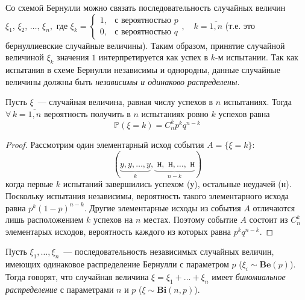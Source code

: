 Со схемой Бернулли можно связать последовательность случайных величин 
$\xi_1,\, \xi_2,\, \ldots,\, \xi_n,$ где $\xi_k = \begin{cases} 1, &\text{с вероятностью } p \\ 0, &\text{с вероятностью } q\end{cases}, \quad k = \overline{1, n}$ (т.е. это бернуллиевские случайные величины).
Таким образом, принятие случайной величиной $\xi_k$ значения $1$ интерпретируется как успех в $k$-м испытании.
Так как испытания в схеме Бернулли независимы и однородны, данные случайные величины должны быть \textit{независимы и одинаково распределены}.


\begin{namedthm}
Пусть $\xi$~--- случайная величина, равная числу успехов в $n$ испытаниях. 
Тогда $\forall \, k = \overline{1,n}$ вероятность получить в $n$ испытаниях ровно $k$ успехов равна
\begin{equation*}
    \mathbb{P}\left(\xi=k\right)=C_{n}^{k} p^{k} q^{n-k}
\end{equation*}
\end{namedthm}

\begin{proof}
    Рассмотрим один элементарный исход события $A = \{\xi = k \}$:
    \begin{equation*}
        (\underbrace{y, y, \ldots, y}_{k}, \underbrace{\textit{ н}, \textit{ н}, \ldots,\textit{ н}}_{n-k})
    \end{equation*}
    когда первые $k$ испытаний завершились успехом (у), остальные неудачей (н). 
    Поскольку испытания независимы, вероятность такого элементарного исхода равна $p^k(1 - p)^{n-k}.$ 
    Другие элементарные исходы из события $A$ отличаются лишь расположением $k$ успехов на $n$ местах. 
    Поэтому событие $A$ состоит из $C_n^k$ элементарых исходов, вероятность каждого из которых равна $p^kq^{n-k}$.
\end{proof}

\begin{defn}
    Пусть $\xi_1, \ldots, \xi_n$~--- последовательность независимых случайных величин, имеющих одинаковое распределение Бернулли с параметром $p$ ($\xi_i \sim \mathbf{Be}(p)$).
    Тогда говорят, что случайная величина $\xi = \xi_1 + \ldots + \xi_n$ имеет \textit{биномиальное распределение} с параметрами $n$ и $p$ ($\xi \sim \mathbf{Bi}(n, p)$).
\end{defn}

